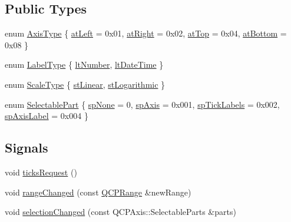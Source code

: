 \subsection*{Public Types}
\begin{DoxyCompactItemize}
\item 
enum \hyperlink{class_q_c_p_axis_ae2bcc1728b382f10f064612b368bc18a}{Axis\-Type} \{ \hyperlink{class_q_c_p_axis_ae2bcc1728b382f10f064612b368bc18aaf84aa6cac6fb6099f54a2cbf7546b730}{at\-Left} = 0x01, 
\hyperlink{class_q_c_p_axis_ae2bcc1728b382f10f064612b368bc18aadf5509f7d29199ef2f263b1dd224b345}{at\-Right} = 0x02, 
\hyperlink{class_q_c_p_axis_ae2bcc1728b382f10f064612b368bc18aac0ece2b680d3f545e701f75af1655977}{at\-Top} = 0x04, 
\hyperlink{class_q_c_p_axis_ae2bcc1728b382f10f064612b368bc18aa220d68888516b6c3b493d144f1ba438f}{at\-Bottom} = 0x08
 \}
\item 
enum \hyperlink{class_q_c_p_axis_a4a7da0166f755f5abac23b765d184cad}{Label\-Type} \{ \hyperlink{class_q_c_p_axis_a4a7da0166f755f5abac23b765d184cada7f1eacf3b73adaefd334bea04e094b7e}{lt\-Number}, 
\hyperlink{class_q_c_p_axis_a4a7da0166f755f5abac23b765d184cadafc70594a9d877124dd11ccc187d4ac52}{lt\-Date\-Time}
 \}
\item 
enum \hyperlink{class_q_c_p_axis_a36d8e8658dbaa179bf2aeb973db2d6f0}{Scale\-Type} \{ \hyperlink{class_q_c_p_axis_a36d8e8658dbaa179bf2aeb973db2d6f0aff6e30a11a828bc850caffab0ff994f6}{st\-Linear}, 
\hyperlink{class_q_c_p_axis_a36d8e8658dbaa179bf2aeb973db2d6f0abf5b785ad976618816dc6f79b73216d4}{st\-Logarithmic}
 \}
\item 
enum \hyperlink{class_q_c_p_axis_abee4c7a54c468b1385dfce2c898b115f}{Selectable\-Part} \{ \hyperlink{class_q_c_p_axis_abee4c7a54c468b1385dfce2c898b115fae0df8123a5528d5ccf87cb7794f971ea}{sp\-None} = 0, 
\hyperlink{class_q_c_p_axis_abee4c7a54c468b1385dfce2c898b115fa8949d2c1a31eccae9be7ed32e7a1ae38}{sp\-Axis} = 0x001, 
\hyperlink{class_q_c_p_axis_abee4c7a54c468b1385dfce2c898b115fa584e0a3dc4d064880647619f4bd4e771}{sp\-Tick\-Labels} = 0x002, 
\hyperlink{class_q_c_p_axis_abee4c7a54c468b1385dfce2c898b115fa851e0600e0d08b4f5fee9361e3fedabd}{sp\-Axis\-Label} = 0x004
 \}
\end{DoxyCompactItemize}
\subsection*{Signals}
\begin{DoxyCompactItemize}
\item 
void \hyperlink{class_q_c_p_axis_af46d99613d29518795134ec4928e3873}{ticks\-Request} ()
\item 
void \hyperlink{class_q_c_p_axis_a0894084e4c16a1736534c4095746f910}{range\-Changed} (const \hyperlink{class_q_c_p_range}{Q\-C\-P\-Range} \&new\-Range)
\item 
void \hyperlink{class_q_c_p_axis_a62b598abeee7174a05f9d542cc85b1f5}{selection\-Changed} (const Q\-C\-P\-Axis\-::\-Selectable\-Parts \&parts)
\end{DoxyCompactItemize}
